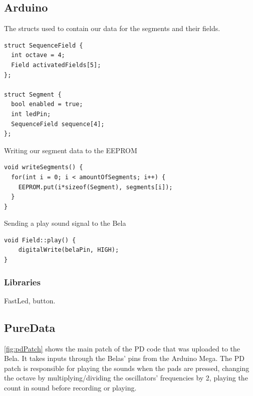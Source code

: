 	\subsection{Arduino}%
		\begin{listing}[H]
			\caption{The structs used to contain our data for the segments and their fields.}
			\label{listing:structs}
			\begin{verbatim}
struct SequenceField {
  int octave = 4;
  Field activatedFields[5];
};

struct Segment {
  bool enabled = true;
  int ledPin;
  SequenceField sequence[4];
};
			\end{verbatim}
		\end{listing}
		
		\begin{listing}[H]
			\caption{Writing our segment data to the EEPROM}
			\label{listing:writeSegment}
			\begin{verbatim}
void writeSegments() {
  for(int i = 0; i < amountOfSegments; i++) {
	EEPROM.put(i*sizeof(Segment), segments[i]);
  }
}
			\end{verbatim}
		\end{listing}
	
		\begin{listing}[H]
			\caption{Sending a play sound signal to the Bela}
			\label{listing:playSound}
			\begin{verbatim}
void Field::play() {
	digitalWrite(belaPin, HIGH);
}
			\end{verbatim}
		\end{listing}
	
		\subsubsection{Libraries}%
			FastLed, button.
	\subsection{PureData}%
	\autoref{fig:pdPatch} shows the main patch of the PD code that was uploaded to the Bela. It takes inputs through the Belas' pins from the Arduino Mega. The PD patch is responsible for playing the sounds when the pads are pressed, changing the octave by multiplying/dividing the oscillators' frequencies by 2, playing the count in sound before recording or playing.
	
